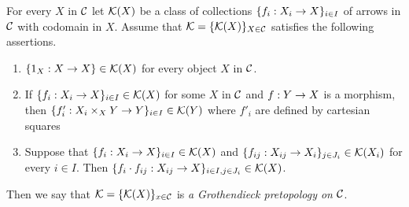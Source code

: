 \begin{definition}
For every $X$ in ${\mathcal C}$ let ${\mathcal K}(X)$ be a class of collections $\{f_i:X_i\rightarrow X\}_{i\in I}$ of arrows in ${\mathcal C}$ with codomain in $X$. Assume that ${\mathcal K}=\{{\mathcal K}(X)\}_{X\in {\mathcal C}}$ satisfies the following assertions.
\begin{enumerate}[label=\textbf{(\arabic*)}, leftmargin=3.0em]
\item $\{1_X:X\rightarrow X\}\in {\mathcal K}(X)$ for every object $X$ in ${\mathcal C}$. 
\item If $\{f_i:X_i\rightarrow X\}_{i\in I}\in {\mathcal K}(X)$ for some $X$ in ${\mathcal C}$ and $f:Y\rightarrow X$ is a morphism, then $\{f'_i:X_i\times_XY\rightarrow Y\}_{i\in I}\in {\mathcal K}(Y)$ where $f'_i$ are defined by cartesian squares
\begin{center}
\end{center}
\item Suppose that $\{f_i:X_i\rightarrow X\}_{i\in I} \in {\mathcal K}(X)$ and $\{f_{ij}:X_{ij}\rightarrow X_i\}_{j\in J_i}\in {\mathcal K}(X_i)$ for every $i\in I$. Then $\{f_i\cdot f_{ij}:X_{ij}\rightarrow X\}_{i\in I,j\in J_i}\in {\mathcal K}(X)$.
\end{enumerate}
Then we say that ${\mathcal K}=\{{\mathcal K}(X)\}_{x\in {\mathcal C}}$ is \textit{a Grothendieck pretopology on ${\mathcal C}$}.
\end{definition}

